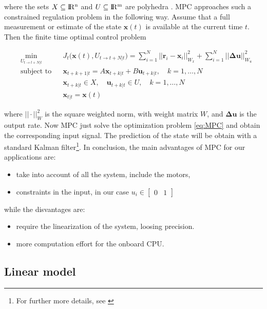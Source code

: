 \noindent where the sets $X \subseteq \rm I\!R^n$ and $U \subseteq \rm I\!R^m$ are polyhedra \cite{MPC}. MPC approaches such a constrained regulation problem in the following way. Assume that a full measurement or estimate of the state $\mathbf{x}(t)$ is available at the current time $t$. Then the finite time optimal control problem

\begin{align}
	&\min_{U_{t\to t+N|t}} &&J_t\big(\mathbf{x}(t), U_{t\to t+N|t}\big)=\sum_{i=1}^N||\mathbf{r}_i-\mathbf{x}_i||^2_{W_x} + \sum_{i=1}^N||\boldsymbol{\Delta}\mathbf{u}||^2_{W_u} \label{eq:MPC} \\
	&\text{subject to} &&\mathbf{x}_{t+k+1|t}=A\mathbf{x}_{t+k|t}+B\mathbf{u}_{t+k|t}, \quad k=1,\dots,N \nonumber \\
	& &&\mathbf{x}_{t+k|t} \in X, \quad \mathbf{u}_{t+k|t} \in U, \quad k=1,\dots,N \nonumber \\
	& &&\mathbf{x}_{t|t}=\mathbf{x}(t) \nonumber
\end{align}

\noindent where $||\cdot||^2_{W}$ is the square weighted norm, with weight matrix $W$, and $\boldsymbol{\Delta}\mathbf{u}$ is the output rate. Now MPC just solve the optimization problem \eqref{eq:MPC} and obtain the corresponding input signal. The prediction of the state will be obtain with a standard Kalman filter\footnote{For further more details, see \cite{MPC}}. In conclusion, the main advantages of MPC for our applications are:

\begin{itemize}
	\item take into account of all the system, include the motors,
	\item constraints in the input, in our case $u_{i} \in \begin{bmatrix}0 & 1 \end{bmatrix}$
\end{itemize}

\noindent while the disvantages are:

\begin{itemize}
	\item require the linearization of the system, loosing precision.
	\item more computation effort for the onboard CPU.
\end{itemize}

\subsection{Linear model}

